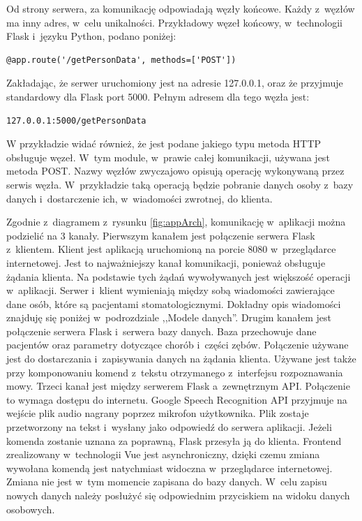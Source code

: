 Od strony serwera, za komunikację odpowiadają węzły końcowe. Każdy z~węzłów ma inny adres, w~celu  unikalności. Przykładowy węzeł końcowy, w~technologii Flask i~języku Python, podano poniżej:
\begin{lstlisting}
@app.route('/getPersonData', methods=['POST'])
\end{lstlisting}
Zakładając, że serwer uruchomiony jest na adresie 127.0.0.1, oraz że przyjmuje standardowy dla Flask port 5000. Pełnym adresem dla tego węzła jest:
\begin{lstlisting}
127.0.0.1:5000/getPersonData
\end{lstlisting}
W przykładzie widać również, że jest podane jakiego typu metoda HTTP obsługuje węzeł. W~tym module, w~prawie całej komunikacji, używana jest metoda POST. Nazwy węzłów zwyczajowo opisują operację wykonywaną przez serwis węzła. W~przykładzie taką operacją będzie pobranie danych osoby z~bazy danych i~dostarczenie ich, w~wiadomości zwrotnej, do klienta. 

Zgodnie z~diagramem z~rysunku \ref{fig:appArch}, komunikację w~aplikacji można podzielić na 3 kanały. Pierwszym kanałem jest połączenie serwera Flask z~klientem. Klient jest aplikacją uruchomioną na porcie 8080 w~przeglądarce internetowej. Jest to najważniejszy kanał komunikacji, ponieważ obsługuje żądania klienta. Na podstawie tych żądań wywoływanych jest większość operacji w~aplikacji. Serwer i~klient wymieniają między sobą wiadomości zawierające dane osób, które są pacjentami stomatologicznymi. Dokładny opis wiadomości znajduję się poniżej w~podrozdziale ,,Modele danych''. Drugim kanałem jest połączenie serwera Flask i~serwera bazy danych. Baza przechowuje dane pacjentów oraz parametry dotyczące chorób i~części zębów. Połączenie używane jest do dostarczania i~zapisywania danych na żądania klienta. Używane jest także przy komponowaniu komend z~tekstu otrzymanego z~interfejsu rozpoznawania mowy. Trzeci kanał jest między serwerem Flask a~zewnętrznym API. Połączenie to wymaga dostępu do internetu. Google Speech Recognition API przyjmuje na wejście plik audio nagrany poprzez mikrofon użytkownika. Plik zostaje przetworzony na tekst i~wysłany jako odpowiedź do serwera aplikacji. Jeżeli komenda zostanie uznana za poprawną, Flask przesyła ją do klienta. Frontend zrealizowany w~technologii Vue jest asynchroniczny, dzięki czemu zmiana wywołana komendą jest natychmiast widoczna w~przeglądarce internetowej. Zmiana nie jest w~tym momencie zapisana do bazy danych. W~celu zapisu nowych danych należy posłużyć się odpowiednim przyciskiem na widoku danych osobowych. 

